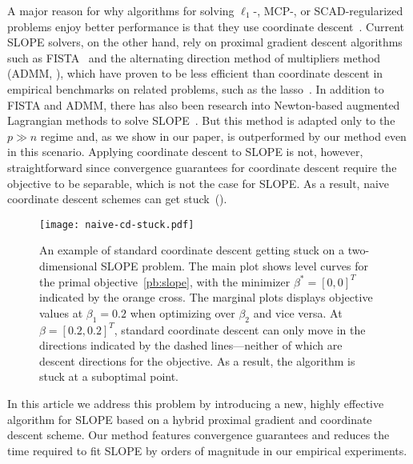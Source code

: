 A major reason for why algorithms for solving
$\ell_1$-, MCP-, or SCAD-regularized problems enjoy better performance is that
they use coordinate
descent~\parencite{tseng2001convergence,friedman2010,breheny2011}. Current SLOPE
solvers, on the other hand, rely on proximal gradient descent algorithms such
as FISTA~\parencite{beck2009} and the alternating direction method of multipliers
method (ADMM, \cite{boyd2010}), which have proven to be less efficient than
coordinate descent in empirical benchmarks on related problems, such as the
lasso~\parencite{moreau2022benchopt}.
In addition to FISTA and ADMM, there has also been research into Newton-based augmented Lagrangian methods to solve SLOPE~\parencite{Ziyan2019}.
But this method is adapted only to the \(p \gg n\) regime and, as we show in our paper, is outperformed by our method even in this scenario.
Applying coordinate descent to SLOPE is not,
however, straightforward since convergence guarantees for coordinate descent
require the objective to be separable, which is not the case for SLOPE. As a
result, naive coordinate descent schemes can get
stuck~().

\begin{figure}[htb]
  \centering
  \texttt{[image: naive-cd-stuck.pdf]}
  \caption{%
    An example of standard coordinate descent getting stuck on a two-dimensional SLOPE problem.
    The main plot shows level curves for the primal objective~\eqref{pb:slope}, with the minimizer \(\beta^* = [0, 0]^T\) indicated by the orange cross.
    The marginal plots displays objective values at \(\beta_1 = 0.2\) when optimizing over \(\beta_2\) and vice versa.
    At \(\beta = [0.2,0.2]^T\), standard coordinate descent can only move in the directions indicated by the dashed lines---neither of which are descent directions for the objective.
    As a result, the algorithm is stuck at a suboptimal point.
  }
  \label{fig:naive-cd-stuck}
\end{figure}

In this article we address this problem by introducing a new, highly effective
algorithm for SLOPE based on a hybrid proximal gradient and coordinate descent
scheme. Our method features convergence guarantees and reduces the time
required to fit SLOPE by orders of magnitude in our empirical experiments.


